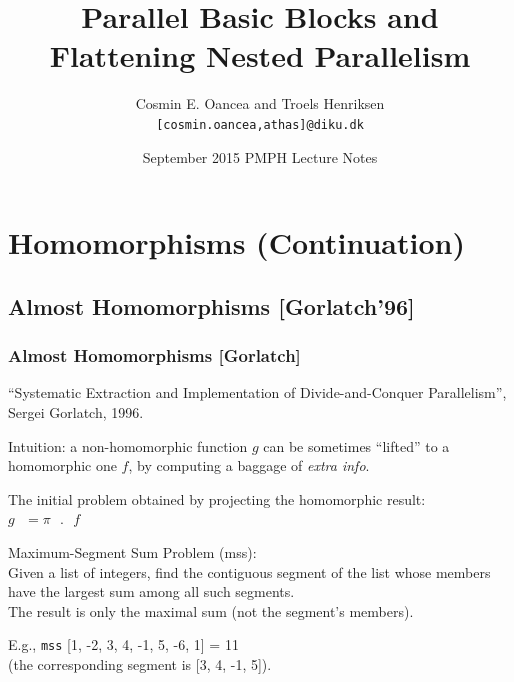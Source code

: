 \documentclass{beamer}
\title[Intro]{Parallel Basic Blocks and\\ Flattening Nested Parallelism}
\author[C.~Oancea]{Cosmin E. Oancea and Troels Henriksen\\{\tt [cosmin.oancea,athas]@diku.dk}}
\institute{Department of Computer Science (DIKU)\\University of Copenhagen}
\date[Sept 2015]{September 2015 PMPH Lecture Notes}
\renewcommand{\emph}[1]{\textcolor{structure}{#1}}
\newcommand{\emp}[1]{\textcolor{DikuRed}{ #1}}
\begin{document}
\titleslide


\begin{frame}[fragile]
	\tableofcontents
\end{frame}


\section{Homomorphisms (Continuation)}

\subsection{Almost Homomorphisms [Gorlatch'96]}


\begin{frame}[fragile,t]
  \frametitle{Almost Homomorphisms [Gorlatch]}

\emp{``Systematic Extraction and Implementation of Divide-and-Conquer Parallelism'', Sergei Gorlatch, 1996.} 
\bigskip

\emph{Intuition}: a non-homomorphic function $g$ can be sometimes ``lifted'' 
to a homomorphic one $f$, by computing a baggage of \emp{\em extra info}. 

\bigskip

The initial problem obtained by projecting the homomorphic result:\\
$g\mbox{ }=\pi\mbox{ }.\mbox{ }f$

\bigskip

\emp{Maximum-Segment Sum Problem ({\sc mss})}: \\
Given a list of integers, find the contiguous segment of the list 
whose members have the largest sum among all such segments.\\
The result is only the maximal sum (not the segment's members).

\bigskip

E.g., {\tt mss} [1, -2, 3, 4, -1, 5, -6, 1] = 11 \\
(the corresponding segment is [3, 4, -1, 5]). 

\end{frame}
\end{document}
